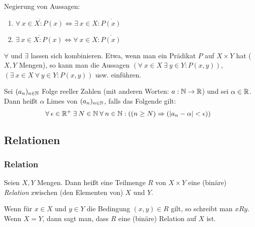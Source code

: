 \begin{bem}
	Negierung von Aussagen:
	\begin{enumerate}
		\item $ \overline{\forall\: x \in X : P(x)} \Leftrightarrow \exists\: x \in X : \overline{P(x)} $
		\item $ \overline{\exists\: x \in X : P(x)} \Leftrightarrow \forall\: x \in X : \overline{P(x)} $
	\end{enumerate}
\end{bem}

\begin{bem}
	$ \forall $ und $ \exists $ lassen sich kombinieren. Etwa, wenn man ein Prädikat $ P $ auf $ X \times Y $ hat ($ X,Y $ Mengen), so kann man die Aussagen $ \left( \forall\: x \in X \:\exists\: y \in Y : P(x,y) \right) $, $ \left( \exists\: x \in X \:\forall\: y \in Y : P(x,y) \right) $ usw. einführen.
\end{bem}

\begin{bsp}
	Sei $ (a_n)_{n \in \mathbb N} $ Folge reeller Zahlen (mit anderen Worten: $ a : \mathbb N \to \mathbb R $) und sei $ \alpha \in \mathbb R $. Dann heißt $ \alpha $ Limes von $ (a_n)_{n \in \mathbb N} $, falls das Folgende gilt:
	\begin{equation*}
		\forall\: \epsilon \in \mathbb R^+ \:\exists\: N \in \mathbb N \:\forall\: n \in \mathbb N: \left( (n \geq N) \Rightarrow (|a_n - \alpha| < \epsilon) \right)
	\end{equation*}
\end{bsp} 

\clearpage
\subsection{Relationen}

\subsubsection{Relation}

Seien $ X,Y $ Mengen. Dann heißt eine Teilmenge $ R $ von $ X \times Y $ eine (binäre) \emph{Relation} zwischen (den Elementen von) $ X $ und $ Y $.

Wenn für $ x \in X $ und $ y \in Y $ die Bedingung $ (x,y) \in R $ gilt, so schreibt man $ x R y $. Wenn $ X = Y $, dann sagt man, dass $ R $ eine (binäre) Relation auf $ X $ ist.

